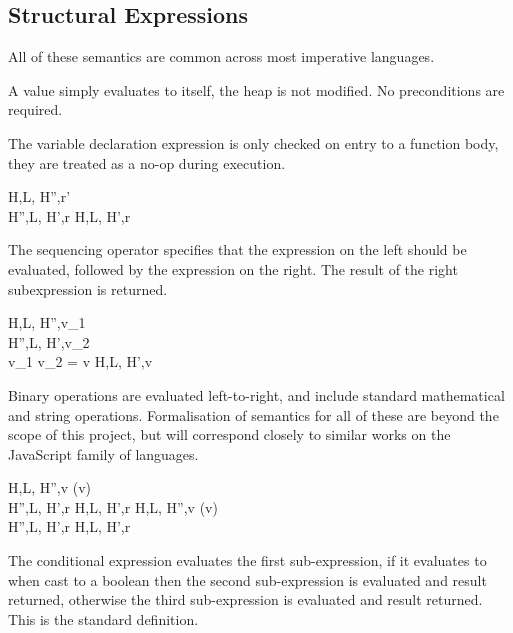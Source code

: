 \documentclass[a4paper,notitlepage]{report}
\begin{document}
  \subsection{Structural Expressions}
  \label{subsec:structuralexpressions}
  All of these semantics are common across most imperative languages.


  A value simply evaluates to itself, the heap is not modified. No preconditions
  are required.


  The variable declaration expression is only checked on entry to a function
  body, they are treated as a no-op during execution.

    {H,L, \evalsto H'',r' \\
     H'',L, \evalsto H',r}
   {H,L, \evalsto H',r}
  \nopagebreak

  The sequencing operator specifies that the expression on the left should be
  evaluated, followed by the expression on the right. The result of the right
  subexpression is returned.

    {H,L, \gevalsto H'',v_1 \\
     H'',L, \gevalsto H',v_2\\
     v_1 \oplus v_2 = v}
   {H,L, \evalsto H',v}

  Binary operations are evaluated left-to-right, and include standard
  mathematical and string operations. Formalisation of semantics for all of these
  are beyond the scope of this project, but will correspond closely to similar
  works on the JavaScript family of languages.

  {H,L, \gevalsto H'',v \quad \istrue(v) \\
   H'',L, \evalsto H',r}
  {H,L, \evalsto H',r}
\qquad
  {H,L, \gevalsto H'',v \quad \isfalse(v) \\
   H'',L, \evalsto H',r}
  {H,L, \evalsto H',r}

  The conditional expression evaluates the first sub-expression, if it evaluates
  to  when cast to a boolean then the second
  sub-expression is evaluated and result returned, otherwise the third
  sub-expression is evaluated and result returned. This is the standard
  definition.
\end{document}
